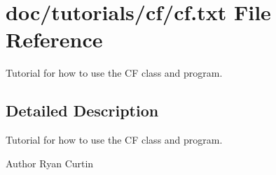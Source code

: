 \section{doc/tutorials/cf/cf.txt File Reference}
\label{cf_8txt}


Tutorial for how to use the CF class and program.  




\subsection{Detailed Description}
Tutorial for how to use the CF class and program. 

\begin{DoxyAuthor}{Author}
Ryan Curtin 
\end{DoxyAuthor}
